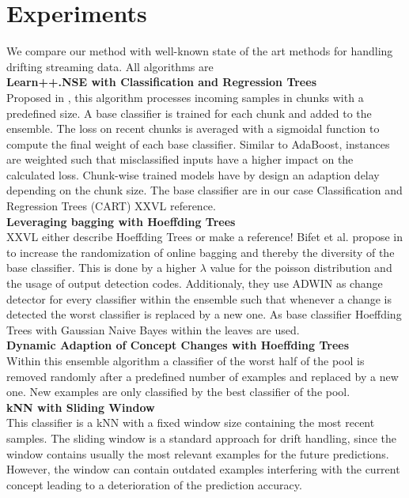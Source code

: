 \documentclass[conference]{IEEEtran}
\begin{document}
\section{Experiments}
We compare our method with well-known state of the art methods for handling drifting streaming data. All algorithms are
\\\textbf{Learn++.NSE with Classification and Regression Trees}\\
Proposed in \cite{5975223}, this algorithm processes incoming samples in chunks with a predefined size. A base classifier is trained for each chunk and added to the ensemble. The loss on recent chunks is averaged with a sigmoidal function
to compute the final weight of each base classifier. Similar to AdaBoost, instances are weighted such that misclassified inputs have a higher impact on the calculated loss.
Chunk-wise trained models have by design an adaption delay depending on the chunk size. The base classifier are in our case Classification and Regression Trees (CART) XXVL reference.
\\\textbf{Leveraging bagging with Hoeffding Trees}\\
XXVL either describe Hoeffding Trees or make a reference!
Bifet et al. propose in \cite{bifet2010leveraging}to increase the randomization of online bagging \cite{oza2005online} and thereby the diversity of the base classifier.
This is done by a higher $\lambda$ value for the poisson distribution and the usage of output detection codes. Additionaly, they use ADWIN as change detector for every classifier within the ensemble such that whenever a change is detected 
the worst classifier is replaced by a new one. As base classifier Hoeffding Trees with Gaussian Naive Bayes within the leaves are used.
\\\textbf{Dynamic Adaption of Concept Changes with Hoeffding Trees}\\
Within this ensemble algorithm \cite{jaber2013online} a classifier of the worst half of the pool is removed randomly after a predefined number of examples and replaced by a new one. New examples are only
classified by the best classifier of the pool.
\\\textbf{kNN with Sliding Window}\\
This classifier is a kNN with a fixed window size containing the most recent samples. The sliding window is a standard approach for drift handling, since the window contains usually the most relevant examples
for the future predictions. However, the window can contain outdated examples interfering with the current concept leading to a deterioration of the prediction accuracy. 
\end{document}
